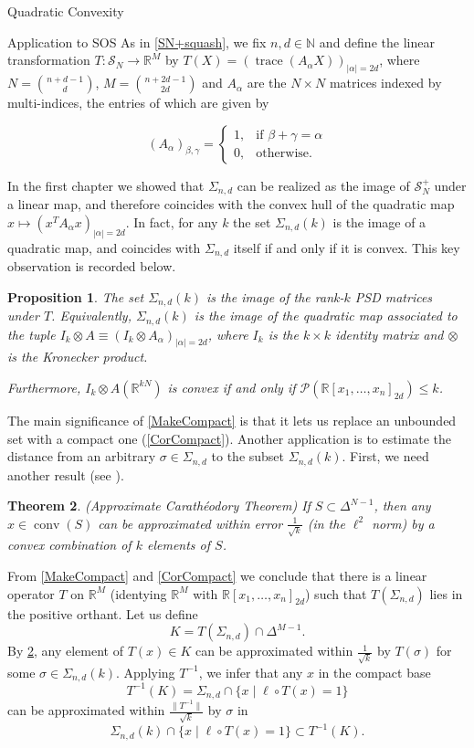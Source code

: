 \documentclass[12pt,oneside,final]{ucthesisucsbmath2010}
\newcommand{\R}{\mathbb{R}}
\newcommand{\N}{\mathbb{N}}
\newcommand{\s}{\mathcal{S}}
\newcommand{\p}{\mathcal{P}}
\newcommand{\snd}{\Sigma_{n,d}}
\newcommand{\pnd}{\R[x_1,\ldots,x_n]_{2d}}
\DeclareMathOperator{\trace}{trace}
\DeclareMathOperator{\conv}{conv}
\newtheorem{thm}{Theorem}[section]
\newtheorem{prop}[thm]{Proposition}
\theoremstyle{definition}
\begin{document}
\begin{chapter}{Quadratic Convexity}
\begin{section}{Application to SOS}
As in \ref{SN+squash}, we fix $n,d \in \N$ and define the linear transformation $T:\s_N \to \R^M$ by $T(X)=(\trace(A_\alpha X))_{|\alpha|=2d}$, where $N=\binom{n+d-1}{d}$, $M = \binom{n+2d-1}{2d}$ and $A_\alpha$ are the $N\times N$ matrices indexed by multi-indices, the entries of which are given by

\[(A_\alpha)_{\beta,\gamma} = 
\begin{cases}
1, & \text{if }\beta+\gamma=\alpha \\
0, & \text{otherwise. }
\end{cases}
\]


In the first chapter we showed that $\snd$ can be realized as the image of $\s_N^+$ under a linear map, and therefore coincides with the convex hull of the quadratic map $x \longmapsto (x^TA_\alpha x)_{|\alpha|=2d}$. In fact, for any $k$ the set $\snd(k)$ is the image of a quadratic map, and coincides with $\snd$ itself if and only if it is convex. This key observation is recorded below.

\begin{prop}The set $\snd(k)$ is the image of the rank-$k$ PSD matrices under $T$. Equivalently, $\snd(k)$ is the image of the quadratic map associated to the tuple $I_k\otimes A \equiv (I_k \otimes A_\alpha )_{|\alpha|=2d}$, where $I_k$ is the $k\times k$ identity matrix and $\otimes$ is the Kronecker product.

Furthermore, $I_k\otimes A(\R^{kN})$ is convex if and only if $\p(\pnd) \leq k$.
\label{WeakPyth}
\end{prop}

The main significance of \ref{MakeCompact} is that it lets us replace an unbounded set with a compact one (\ref{CorCompact}). Another application is to estimate the distance from an arbitrary $\sigma \in \snd$ to the subset $\snd(k)$. First, we need another result (see \cite{Pisier}).

\begin{thm}(Approximate Carath\'{e}odory Theorem) If $S \subset \Delta^{N-1}$, then any $x \in \conv(S)$ can be approximated within error $\tfrac{1}{\sqrt {k}}$ (in the $\ell^2$ norm) by a convex combination of $k$ elements of $S$.
\label{ProxCara}
\end{thm}

From \ref{MakeCompact} and \ref{CorCompact} we conclude that there is a linear operator $T$ on $\R^M$ (identying $\R^M$ with $\pnd$) such that $T(\snd)$ lies in the positive orthant. Let us define 
\[K = T(\snd) \cap \Delta^{M-1}.\]
By \ref{ProxCara}, any element of $T(x)\in K$ can be approximated within $\tfrac{1}{\sqrt {k}}$ by $T(\sigma)$ for some $\sigma \in \snd(k)$. Applying $T^{-1}$, we infer that any $x$ in the compact base \[ T^{-1}(K)=\snd \cap \{x \mid \ell \circ T(x) = 1\}\] can be approximated within $\tfrac{\|T^{-1}\|}{\sqrt{k}}$ by $\sigma$ in \[\snd(k) \cap \{x \mid \ell \circ T(x) = 1\}\subset T^{-1}(K).\]


\end{section}
\end{chapter}
\end{document}
